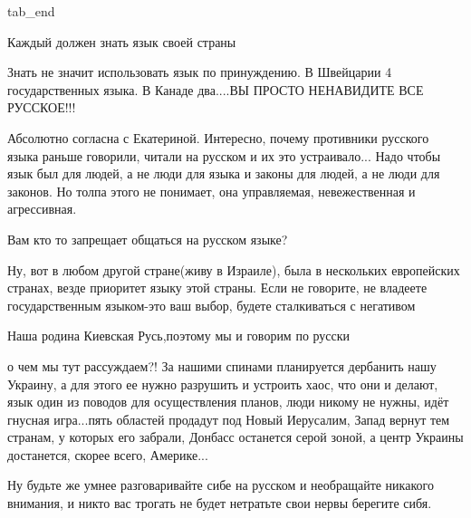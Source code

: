 \begin{itemize}
  tab_end
\fi


Каждый должен знать язык своей страны


Знать не значит использовать язык по принуждению. В Швейцарии 4 государственных
языка. В Канаде два....ВЫ ПРОСТО НЕНАВИДИТЕ ВСЕ РУССКОЕ!!!


Абсолютно согласна с Екатериной. Интересно, почему противники русского языка
раньше говорили, читали на русском и их это устраивало... Надо чтобы язык был
для людей, а не люди для языка и законы для людей, а не люди для законов. Но
толпа этого не понимает, она управляемая, невежественная и агрессивная.

Вам кто то запрещает общаться на русском языке?

Ну, вот в любом другой стране(живу в Израиле), была в нескольких европейских
странах, везде приоритет языку этой страны. Если не говорите, не владеете
государственным языком-это ваш выбор, будете сталкиваться с негативом


Наша родина Киевская Русь,поэтому мы и говорим по русски


о чем мы тут рассуждаем?! За нашими спинами планируется дербанить нашу Украину,
а для этого ее нужно разрушить и устроить хаос, что они и делают, язык один из
поводов для осуществления планов, люди никому не нужны, идёт гнусная
игра...пять областей продадут под Новый Иерусалим, Запад вернут тем странам, у
которых его забрали, Донбасс останется серой зоной, а центр Украины достанется,
скорее всего, Америке...


Ну будьте же умнее разговаривайте сибе на русском и необращайте никакого
внимания, и никто вас трогать не будет нетратьте свои нервы
берегите сибя.

\end{itemize}

